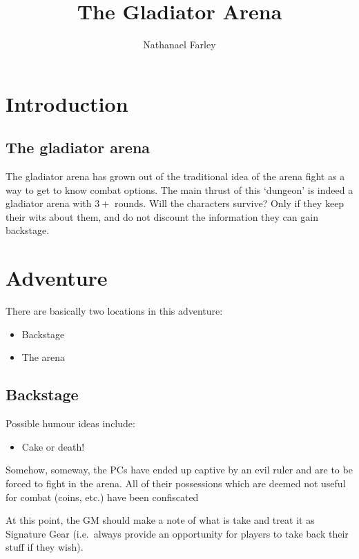 \documentclass[twocolumn]{memoir}
\title{The Gladiator Arena}
\author{Nathanael Farley}
\begin{document}
\RaggedRight
\maketitle
\chapter{Introduction}

\section{The gladiator arena}
The gladiator arena has grown out of the traditional idea of the arena fight as a way to get to know combat options. The main thrust of this `dungeon' is indeed a gladiator arena with \(3+\) rounds. Will the characters survive? Only if they keep their wits about them, and do not discount the information they can gain backstage.

\chapter{Adventure}

There are basically two locations in this adventure:
\begin{itemize}
\item Backstage
\item The arena
\end{itemize}

\section{Backstage}
\begin{commentbox}
Possible humour ideas include:
\begin{itemize}
\item Cake or death!
\end{itemize}
\end{commentbox}
Somehow, someway, the PCs have ended up captive by an evil ruler and are to be forced to fight in the arena. All of their possessions which are deemed not useful for combat (coins, etc.) have been confiscated

\begin{gmtip}
At this point, the GM should make a note of what is take and treat it as Signature Gear (i.e.~always provide an opportunity for players to take back their stuff if they wish).
\end{gmtip}
\end{document}
